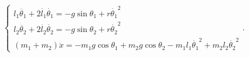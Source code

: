 \documentclass[convert={outfile=\jobname.svg}]{standalone}
\begin{document}
$
    \begin{cases}
            l_1\ddot{\theta_1} + 2\dot{l_1}\dot{\theta_1} = -g\sin\theta_1 + r\dot{\theta_1}^2 \\
            l_2\ddot{\theta_2} + 2\dot{l_2}\dot{\theta_2} = -g\sin\theta_2 + r\dot{\theta_2}^2 \\
            (m_1 + m_2)\ddot{x} = -m_1g\cos\theta_1 + m_2g\cos\theta_2 - m_1l_1\dot{\theta_1}^2 + m_2l_2\dot{\theta_2}^2
    \end{cases}
$\!\!\!\!\!.
\end{document}
